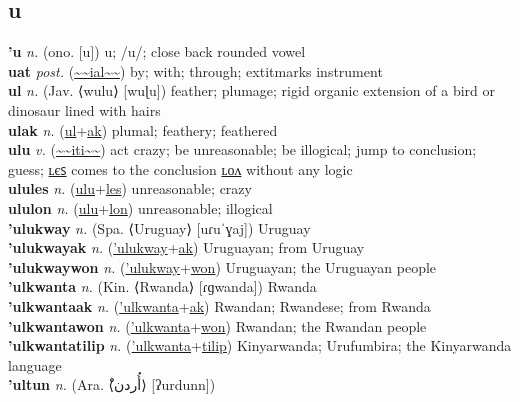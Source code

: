 \subsection{u}

\textbf{'u} \textit{n.} (ono. [u])
u; /u/; close back rounded vowel \label{'u} \\
\textbf{uat} \textit{post.} (\hyperref[ial]{\~{}\~{}ial\~{}\~{}})
by; with; through; 	extit{marks instrument} \label{uat} \\
\textbf{ul} \textit{n.} (Jav. ⟨wulu⟩ [wuɭu])
feather; plumage; rigid organic extension of a bird or dinosaur lined with hairs \label{ul} \\
\textbf{ulak} \textit{n.} (\hyperref[ul]{ul}+\hyperref[ak]{ak})
plumal; feathery; feathered \label{ulak} \\
\textbf{ulu} \textit{v.} (\hyperref[iti]{\~{}\~{}iti\~{}\~{}})
act crazy; be unreasonable; be illogical; jump to conclusion; guess; \hyperref[ulules]{ʟєꜱ} comes to the conclusion \hyperref[ululon]{ʟᴏᴧ} without any logic \label{ulu} \\
\textbf{ulules} \textit{n.} (\hyperref[ulu]{ulu}+\hyperref[les]{les})
unreasonable; crazy \label{ulules} \\
\textbf{ululon} \textit{n.} (\hyperref[ulu]{ulu}+\hyperref[lon]{lon})
unreasonable; illogical \label{ululon} \\
\textbf{'ulukway} \textit{n.} (Spa. ⟨Uruguay⟩ [uɾuˈɣaj])
Uruguay \label{'ulukway} \\
\textbf{'ulukwayak} \textit{n.} (\hyperref['ulukway]{'ulukway}+\hyperref[ak]{ak})
Uruguayan; from Uruguay \label{'ulukwayak} \\
\textbf{'ulukwaywon} \textit{n.} (\hyperref['ulukway]{'ulukway}+\hyperref[won]{won})
Uruguayan; the Uruguayan people \label{'ulukwaywon} \\
\textbf{'ulkwanta} \textit{n.} (Kin. ⟨Rwanda⟩ [ɾɡwanda])
Rwanda \label{'ulkwanta} \\
\textbf{'ulkwantaak} \textit{n.} (\hyperref['ulkwanta]{'ulkwanta}+\hyperref[ak]{ak})
Rwandan; Rwandese; from Rwanda \label{'ulkwantaak} \\
\textbf{'ulkwantawon} \textit{n.} (\hyperref['ulkwanta]{'ulkwanta}+\hyperref[won]{won})
Rwandan; the Rwandan people \label{'ulkwantawon} \\
\textbf{'ulkwantatilip} \textit{n.} (\hyperref['ulkwanta]{'ulkwanta}+\hyperref[tilip]{tilip})
Kinyarwanda; Urufumbira; the Kinyarwanda language \label{'ulkwantatilip} \\
\textbf{'ultun} \textit{n.} (Ara. ⟨ْأُردن⟩ [ʔurdunn])
